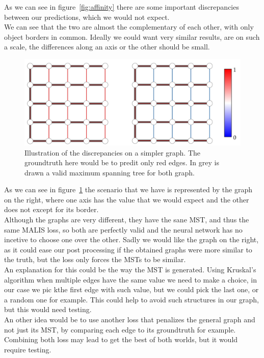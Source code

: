 As we can see in figure~\ref{fig:affinity} there are some important
discrepancies between our predictions, which we would not expect.\\
We can see that the two are almost the complementary of each other, with only
object borders in common. Ideally we eould want very similar results, are on
such a scale, the differences along an axis or the other should be small.

\begin{figure}[!htbp]
	\centering
	\includegraphics[width=0.8\linewidth]{./images/discrepancies_graph.png}
	\caption{Illustration of the discrepancies on a simpler graph. The
	groundtruth here would be to predit only red edges. In grey is drawn a
valid maximum spanning tree for both graph.}%
	\label{fig:discrepancies-graph}
\end{figure}

As we can see in figure~\ref{fig:discrepancies-graph} the scenario that we have
is represented by the graph on the right, where one axis has the value that we
would expect and the other does not except for its border.\\
Although the graphs are very different, they have the sane MST, and thus the
same MALIS loss, so both are perfectly valid and the neural network has no
incetive to choose one over the other. Sadly we would like the graph on the
right, as it could ease our post processing if the obtained graphs were more
similar to the truth, but the loss only forces the MSTs to be similar.\\

An explanation for this could be the way the MST is generated. Using Kruskal's
algorithm when multiple edges have the same value we need to make a choice, in
our case we pic kthe first edge with such value, but we could pick the last
one, or a random one for example. This could help to avoid such structures in
our graph, but this would need testing.\\
An other idea would be to use another loss that penalizes the general graph and
not just its MST, by comparing each edge to its groundtruth for example.
Combining both loss may lead to get the best of both worlds, but it would
require testing.

